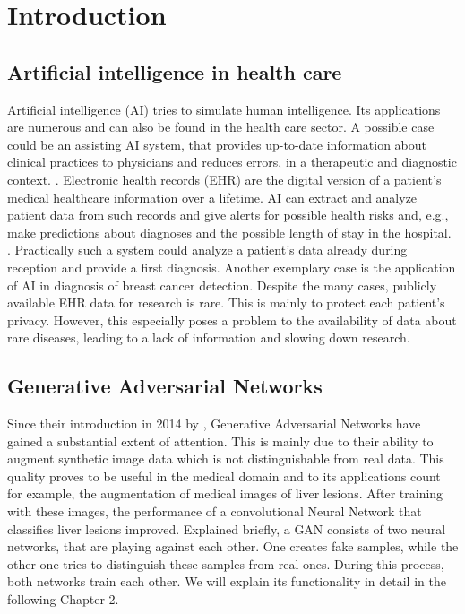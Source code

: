 \documentclass[11pt, a4paper, oneside]{book}
\begin{document}
\chapter{Introduction}

\section{Artificial intelligence in health care}
Artificial intelligence (AI) tries to simulate human intelligence. Its applications are numerous and can also be found in the health care sector. A possible case could be an assisting AI system, that provides up-to-date information about clinical practices to physicians and reduces errors, in a therapeutic and diagnostic context. \citep{jiang2017artificial}. Electronic health records (EHR) are the digital version of a patient's medical healthcare information over a lifetime. AI can extract and analyze patient data from such records and give alerts for possible health risks and, e.g., make predictions about diagnoses and the possible length of stay in the hospital. \citep{neill2013using}. Practically such a system could analyze a patient's data already during reception and provide a first diagnosis. Another exemplary case is the application of AI in diagnosis of breast cancer detection. \citep{ubeyli2007implementing} Despite the many cases, publicly available EHR data for research is rare. This is mainly to protect each patient's privacy. However, this especially poses a problem to the availability of data about rare diseases, leading to a lack of information and slowing down research. \citep{bremond2015contribution}

\section{Generative Adversarial Networks}
Since their introduction in 2014 by \citep{Goodfellow2014}, Generative Adversarial Networks have gained a substantial extent of attention. This is mainly due to their ability to augment synthetic image data which is not distinguishable from real data. This quality proves to be useful in the medical domain and to its applications count for example, the augmentation of medical images of liver lesions. After training with these images, the performance of a convolutional Neural Network that classifies liver lesions improved. \citep{frid2018gan} Explained briefly, a GAN consists of two neural networks, that are playing against each other. One creates fake samples, while the other one tries to distinguish these samples from real ones. During this process, both networks train each other. \citep{Goodfellow2014} We will explain its functionality in detail in the following Chapter 2.
\end{document}
